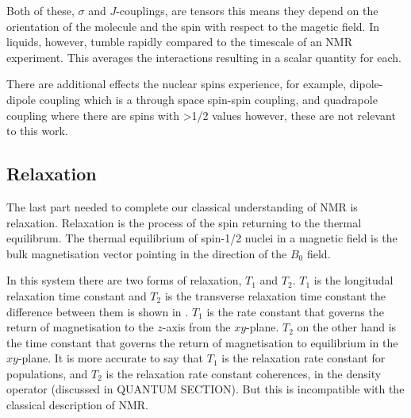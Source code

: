 Both of these, $\sigma$ and $J$-couplings, are tensors this means they depend on the orientation of the molecule
and the spin with respect to the magetic field. In liquids, however, tumble rapidly compared to the timescale
of an NMR experiment. This averages the interactions resulting in a scalar quantity for each.

There are additional effects the nuclear spins experience, for example, dipole-dipole coupling which
is a through space spin-spin coupling, and quadrapole coupling where there are spins with >1/2 values
however, these are not relevant to this work.

\subsection{Relaxation}

The last part needed to complete our classical understanding of NMR is relaxation. Relaxation is the process
of the spin returning to the thermal equilibrum. The thermal equilibrium of spin-1/2 nuclei in a
magnetic field is the bulk magnetisation vector pointing in the direction of the $B_0$ field.

In this system there are two forms of relaxation, $T_1$ and $T_2$. $T_1$ is the longitudal relaxation time
constant and $T_2$ is the transverse relaxation time constant the difference between them is shown in .
$T_1$ is the rate constant that governs the return of magnetisation to the $z$-axis from the $xy$-plane. $T_2$ on
the other hand is the time constant that governs the return of magnetisation to equilibrium in the $xy$-plane.
It is more accurate to say that $T_1$ is the relaxation rate constant for populations, and $T_2$ is the relaxation
rate constant coherences, in the density operator (discussed in QUANTUM SECTION). But this is incompatible
with the classical description of NMR.

